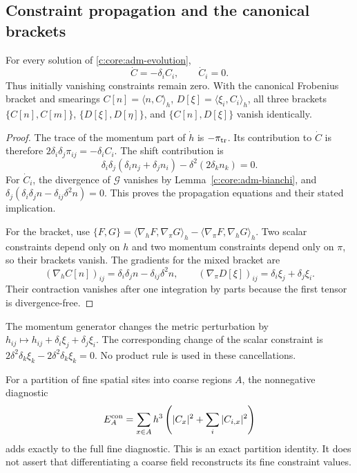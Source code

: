 \subsection{Constraint propagation and the canonical brackets}

\begin{theorem}
\label{c:core:adm-closure}
For every solution of \eqref{c:core:adm-evolution},
\[
 \dot C=-\delta_iC_i,\qquad\dot C_i=0.
\]
Thus initially vanishing constraints remain zero. With the canonical
Frobenius bracket and smearings
$C[n]=\langle n,C\rangle_h$, $D[\xi]=\langle\xi_i,C_i\rangle_h$,
all three brackets $\{C[n],C[m]\}$, $\{D[\xi],D[\eta]\}$, and
$\{C[n],D[\xi]\}$ vanish identically.
\end{theorem}

\begin{proof}
The trace of the momentum part of $\dot h$ is $-\pi_{\rm tr}$.
Its contribution to $\dot C$ is therefore
$2\delta_i\delta_j\pi_{ij}=-\delta_iC_i$. The shift contribution is
\[
 \delta_i\delta_j(\delta_in_j+\delta_jn_i)
 -\delta^2(2\delta_kn_k)=0.
\]
For $\dot C_i$, the divergence of $\mathcal G$ vanishes by
Lemma~\ref{c:core:adm-bianchi}, and
$\delta_j(\delta_i\delta_jn-\delta_{ij}\delta^2n)=0$.
This proves the propagation equations and their stated implication.

For the bracket, use
$\{F,G\}=\langle\nabla_hF,\nabla_\pi G\rangle_h
-\langle\nabla_\pi F,\nabla_hG\rangle_h$.
Two scalar constraints depend only on $h$ and two momentum
constraints depend only on $\pi$, so their brackets vanish.
The gradients for the mixed bracket are
\[
 (\nabla_hC[n])_{ij}=\delta_i\delta_jn-\delta_{ij}\delta^2n,
 \qquad(\nabla_\pi D[\xi])_{ij}=\delta_i\xi_j+\delta_j\xi_i.
\]
Their contraction vanishes after one integration by parts because
the first tensor is divergence-free.
\end{proof}

The momentum generator changes the metric perturbation by
$h_{ij}\mapsto h_{ij}+\delta_i\xi_j+\delta_j\xi_i$.
The corresponding change of the scalar constraint is
$2\delta^2\delta_k\xi_k-2\delta^2\delta_k\xi_k=0$.
No product rule is used in these cancellations.

For a partition of fine spatial sites into coarse regions $A$, the
nonnegative diagnostic
\[
 E_A^{\rm con}=\sum_{x\in A}h^3
 \left(|C_x|^2+\sum_i|C_{i,x}|^2\right)
\]
adds exactly to the full fine diagnostic. This is an exact partition
identity. It does not assert that differentiating a coarse field
reconstructs its fine constraint values.



